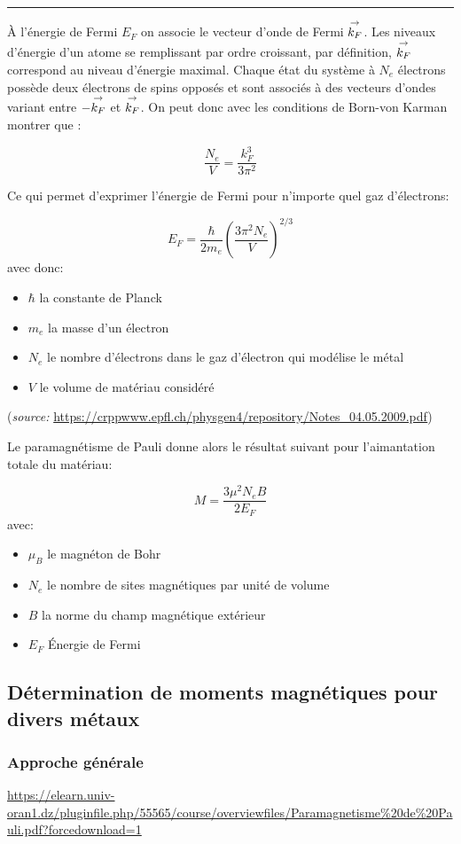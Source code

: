 \documentclass{article}
\begin{document}
\rule{\textwidth}{0.4pt}

À l'énergie de Fermi $E_F$ on associe le vecteur d'onde de Fermi $\overset{\to}{k_F}$. Les niveaux d'énergie d'un atome se remplissant par ordre croissant, par définition, $\overset{\to}{k_F}$ correspond au niveau d'énergie maximal. Chaque état du système à $N_e$ électrons possède deux électrons de spins opposés et sont associés à des vecteurs d'ondes variant entre $-\overset{\to}{k_F}$ et $\overset{\to}{k_F}$. On peut donc avec les conditions de Born-von Karman montrer que :

$$\frac{N_e}{V} = \frac{k_F^3}{3\pi^2}$$

Ce qui permet d'exprimer l'énergie de Fermi pour n'importe quel gaz d'électrons:


    $$E_F = \frac{\hbar}{2m_e} \left(\frac{3\pi^2N_e}{V}\right)^{2/3}$$
avec donc:
    \begin{itemize}
        \item $\hbar$ la constante de Planck
        \item $m_e$ la masse d'un électron
        \item $N_e$ le nombre d'électrons dans le gaz d'électron qui modélise le métal
        \item $V$ le volume de matériau considéré
    \end{itemize}
(\emph{source: }\url{https://crppwww.epfl.ch/physgen4/repository/Notes_04.05.2009.pdf})

Le paramagnétisme de Pauli donne alors le résultat suivant pour l'aimantation totale du matériau:

$$M = \frac{3\mu^2 N_e B}{2 E_F}$$
avec:
\begin{itemize}
    \item $\mu_B$ le magnéton de Bohr
    \item $N_e$ le nombre de sites magnétiques par unité de volume
    \item $B$ la norme du champ magnétique extérieur
    \item $E_F$ Énergie de Fermi
\end{itemize}

\subsection{Détermination de moments magnétiques pour divers métaux}
\subsubsection{Approche générale}
\url{https://elearn.univ-oran1.dz/pluginfile.php/55565/course/overviewfiles/Paramagnetisme%20de%20Pauli.pdf?forcedownload=1}
\end{document}

